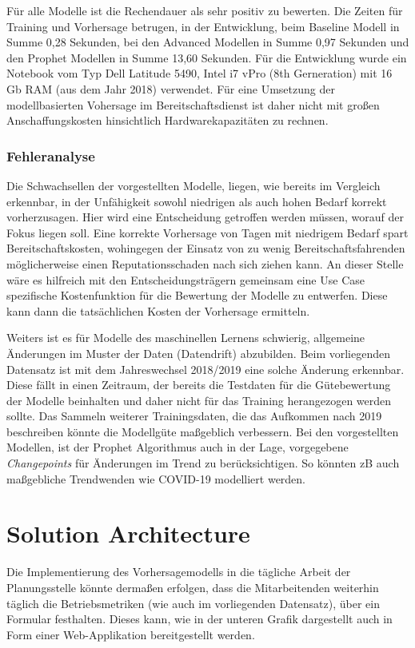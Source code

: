 Für alle Modelle ist die Rechendauer als sehr positiv zu bewerten. Die Zeiten für Training und Vorhersage betrugen, in der Entwicklung, beim Baseline Modell in Summe 0,28 Sekunden, bei den Advanced Modellen in Summe 0,97 Sekunden und den Prophet Modellen in Summe 13,60 Sekunden. Für die Entwicklung wurde ein Notebook vom Typ Dell Latitude 5490, Intel i7 vPro (8th Gerneration) mit 16 Gb RAM (aus dem Jahr 2018) verwendet. Für eine Umsetzung der modellbasierten Vohersage im Bereitschaftsdienst ist daher nicht mit großen Anschaffungskosten hinsichtlich Hardwarekapazitäten zu rechnen.

\subsubsection{Fehleranalyse} 
Die Schwachsellen der vorgestellten Modelle, liegen, wie bereits im Vergleich erkennbar, in der Unfähigkeit sowohl niedrigen als auch hohen Bedarf korrekt vorherzusagen. Hier wird eine Entscheidung getroffen werden müssen, worauf der Fokus liegen soll. Eine korrekte Vorhersage von Tagen mit niedrigem Bedarf spart Bereitschaftskosten, wohingegen der Einsatz von zu wenig Bereitschaftsfahrenden möglicherweise einen Reputationsschaden nach sich ziehen kann. 
An dieser Stelle wäre es hilfreich mit den Entscheidungsträgern gemeinsam eine Use Case spezifische Kostenfunktion für die Bewertung der Modelle zu entwerfen. Diese kann dann die tatsächlichen Kosten der Vorhersage ermitteln. 

Weiters ist es für Modelle des maschinellen Lernens schwierig, allgemeine Änderungen im Muster der Daten (Datendrift) abzubilden. Beim vorliegenden Datensatz ist mit dem Jahreswechsel 2018/2019 eine solche Änderung erkennbar. Diese fällt in einen Zeitraum, der bereits die Testdaten für die Gütebewertung der Modelle beinhalten und daher nicht für das Training herangezogen werden sollte. Das Sammeln weiterer Trainingsdaten, die das Aufkommen nach 2019 beschreiben könnte die Modellgüte maßgeblich verbessern. Bei den vorgestellten Modellen, ist der Prophet Algorithmus auch in der Lage, vorgegebene \textit{Changepoints} für Änderungen im Trend zu berücksichtigen. So könnten zB auch maßgebliche Trendwenden wie COVID-19 modelliert werden.

\section{Solution Architecture}

Die Implementierung des Vorhersagemodells in die tägliche Arbeit der Planungsstelle könnte dermaßen erfolgen, dass die Mitarbeitenden weiterhin täglich die Betriebsmetriken (wie auch im vorliegenden Datensatz), über ein Formular festhalten. Dieses kann, wie in der unteren Grafik dargestellt auch in Form einer Web-Applikation bereitgestellt werden.

